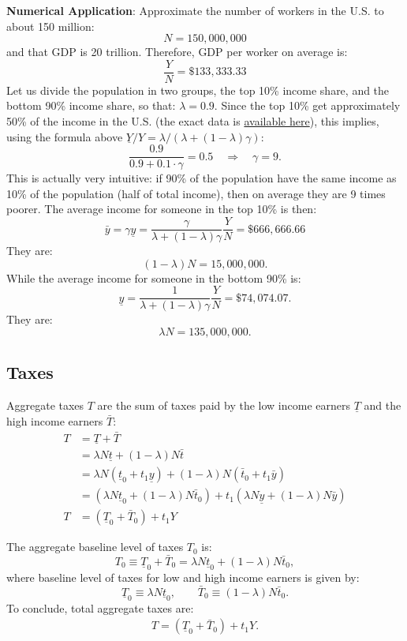 \documentclass[]{book}
\theoremstyle{definition}
\theoremstyle{definition}
\theoremstyle{definition}
\theoremstyle{remark}
\begin{document}
\textbf{Numerical Application}: Approximate the number of workers in the
U.S. to about 150 million: \[N = 150,000,000\] and that GDP is 20
trillion. Therefore, GDP per worker on average is:
\[\frac{Y}{N}=\$133,333.33\] Let us divide the population in two groups,
the top 10\% income share, and the bottom 90\% income share, so that:
\(\lambda = 0.9\). Since the top 10\% get approximately 50\% of the
income in the U.S. (the exact data is
\href{https://wid.world/world/\#sptinc_p90p100_z/US;FR;DE;CN;ZA;GB;WO/last/eu/k/p/yearly/s/false/25.253500000000003/80/curve/false/country}{available
here}), this implies, using the formula above
\(\underline{Y}/Y=\lambda/\left(\lambda +(1-\lambda)\gamma\right)\):
\[\frac{0.9}{0.9+0.1\cdot \gamma}=0.5 \quad \Rightarrow \quad \gamma = 9.\]
This is actually very intuitive: if 90\% of the population have the same
income as 10\% of the population (half of total income), then on average
they are 9 times poorer. The average income for someone in the top 10\%
is then:
\[\bar{y}=\gamma\underline{y}=\frac{\gamma}{\lambda+(1-\lambda)\gamma}\frac{Y}{N}=\$666,666.66\]
They are: \[(1-\lambda) N = 15,000,000.\] While the average income for
someone in the bottom 90\% is:
\[\underline{y}=\frac{1}{\lambda+(1-\lambda)\gamma}\frac{Y}{N}=\$74,074.07.\]
They are: \[\lambda N = 135,000,000.\]

\subsection{Taxes}\label{taxes-1}

Aggregate taxes \(T\) are the sum of taxes paid by the low income
earners \(\underline{T}\) and the high income earners \(\bar{T}\): \[
\begin{aligned}
T&=\underline{T} + \bar{T}\\
&=\lambda N \underline{t} + (1-\lambda) N \bar{t} \\
&=\lambda N \left(\underline{t}_{0}+t_1\underline{y}\right) + (1-\lambda) N \left(\bar{t}_{0}+t_1\bar{y}\right)\\
&=\left(\lambda N \underline{t}_{0} + (1-\lambda) N \bar{t}_{0}\right) + t_1\left(\lambda N \underline{y} + (1-\lambda)N\bar{y} \right)\\
T&=\left(\underline{T}_{0} + \bar{T}_{0}\right) + t_1 Y
\end{aligned}
\]

The aggregate baseline level of taxes \(T_0\) is:
\[T_{0} \equiv \underline{T}_0 +  \bar{T}_0 = \lambda  N \underline{t}_0 + (1-\lambda) N \bar{t}_0,\]
where baseline level of taxes for low and high income earners is given
by:
\[\underline{T}_0\equiv\lambda  N \underline{t}_0, \qquad \bar{T}_0\equiv(1-\lambda) N \bar{t}_0.\]
To conclude, total aggregate taxes are: \[
\begin{aligned}
\boxed{T=\left(\underline{T}_{0}+\bar{T}_{0}\right)+t_1 Y}.
\end{aligned}
\]
\end{document}
